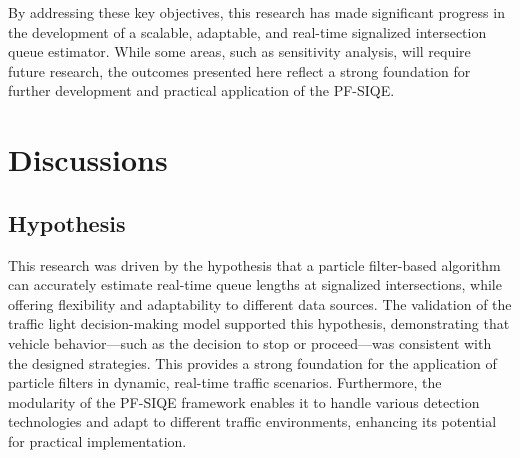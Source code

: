 By addressing these key objectives, this research has made significant progress in the development of a scalable, adaptable, and real-time signalized intersection queue estimator. While some areas, such as sensitivity analysis, will require future research, the outcomes presented here reflect a strong foundation for further development and practical application of the PF-SIQE.


\section{Discussions}


\subsection{Hypothesis}
This research was driven by the hypothesis that a particle filter-based algorithm can accurately estimate real-time queue lengths at signalized intersections, while offering flexibility and adaptability to different data sources. The validation of the traffic light decision-making model supported this hypothesis, demonstrating that vehicle behavior—such as the decision to stop or proceed—was consistent with the designed strategies. This provides a strong foundation for the application of particle filters in dynamic, real-time traffic scenarios. Furthermore, the modularity of the PF-SIQE framework enables it to handle various detection technologies and adapt to different traffic environments, enhancing its potential for practical implementation.

